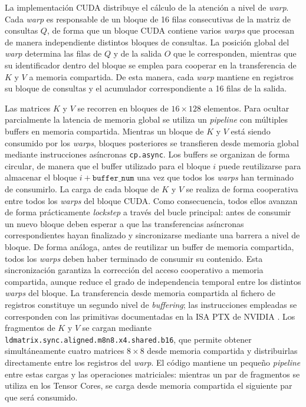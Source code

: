 La implementación CUDA distribuye el cálculo de la atención a nivel de \textit{warp}. Cada \textit{warp} es responsable de un bloque de 16 filas consecutivas de la matriz de consultas \(Q\), de forma que un bloque CUDA contiene varios \textit{warps} que procesan de manera independiente distintos bloques de consultas. La posición global del \textit{warp} determina las filas de \(Q\) y de la salida \(O\) que le corresponden, mientras que su identificador dentro del bloque se emplea para cooperar en la transferencia de \(K\) y \(V\) a memoria compartida. De esta manera, cada \textit{warp} mantiene en registros su bloque de consultas y el acumulador correspondiente a 16 filas de la salida.

Las matrices \(K\) y \(V\) se recorren en bloques de \(16\times128\) elementos. Para ocultar parcialmente la latencia de memoria global se utiliza un \textit{pipeline} con múltiples buffers en memoria compartida. Mientras un bloque de \(K\) y \(V\) está siendo consumido por los \textit{warps}, bloques posteriores se transfieren desde memoria global mediante instrucciones asíncronas \texttt{cp.async}. Los buffers se organizan de forma circular, de manera que el buffer utilizado para el bloque \(i\) puede reutilizarse para almacenar el bloque \(i+\texttt{buffer\_num}\) una vez que todos los \textit{warps} han terminado de consumirlo. La carga de cada bloque de \(K\) y \(V\) se realiza de forma cooperativa entre todos los \textit{warps} del bloque CUDA. Como consecuencia, todos ellos avanzan de forma prácticamente \textit{lockstep} a través del bucle principal: antes de consumir un nuevo bloque deben esperar a que las transferencias asíncronas correspondientes hayan finalizado y sincronizarse mediante una barrera a nivel de bloque. De forma análoga, antes de reutilizar un buffer de memoria compartida, todos los \textit{warps} deben haber terminado de consumir su contenido. Esta sincronización garantiza la corrección del acceso cooperativo a memoria compartida, aunque reduce el grado de independencia temporal entre los distintos \textit{warps} del bloque.
La transferencia desde memoria compartida al fichero de registros constituye un segundo nivel de \textit{buffering}; las instrucciones empleadas se corresponden con las primitivas documentadas en la ISA PTX de NVIDIA \cite{nvidiaPTX}. Los fragmentos de \(K\) y \(V\) se cargan mediante \texttt{ldmatrix.sync.aligned.m8n8.x4.shared.b16}, que permite obtener simultáneamente cuatro matrices \(8\times8\) desde memoria compartida y distribuirlas directamente entre los registros del \textit{warp}. El código mantiene un pequeño \textit{pipeline} entre estas cargas y las operaciones matriciales: mientras un par de fragmentos se utiliza en los Tensor Cores, se carga desde memoria compartida el siguiente par que será consumido.

